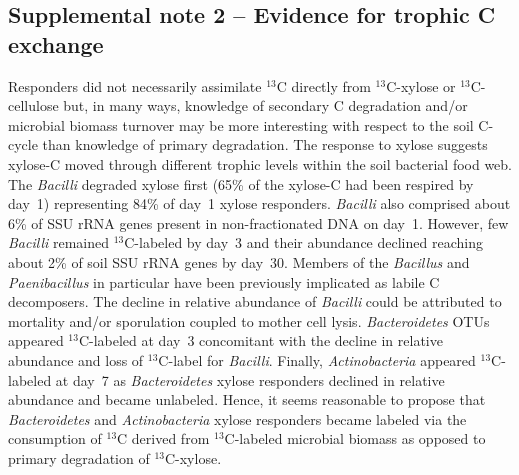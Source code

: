 \documentclass{article}
\begin{document}
\subsection{Supplemental note 2 -- Evidence for trophic C exchange}
Responders did not necessarily assimilate $^{13}$C directly
from $^{13}$C-xylose or $^{13}$C-cellulose but, in many ways, knowledge of
secondary C degradation and/or microbial biomass turnover may be more
interesting with respect to the soil C-cycle than knowledge of primary
degradation. The response to xylose suggests xylose-C moved through different
trophic levels within the soil bacterial food web. The \textit{Bacilli}
degraded xylose first (65\% of the xylose-C had been respired by day~1)
representing 84\% of day~1 xylose responders. \textit{Bacilli} also comprised
about 6\% of SSU rRNA genes present in non-fractionated DNA on day~1. However,
few \textit{Bacilli} remained $^{13}$C-labeled by day~3 and their abundance
declined reaching about 2\% of soil SSU rRNA genes by day~30. Members of the
\textit{Bacillus} \citep{Cleveland2007} and \textit{Paenibacillus} in
particular \citep{Verastegui_2014} have been previously implicated as labile
C decomposers. The decline in relative abundance of \textit{Bacilli} could be
attributed to mortality and/or sporulation coupled to mother cell lysis.
\textit{Bacteroidetes} OTUs appeared $^{13}$C-labeled at day~3 concomitant with
the decline in relative abundance and loss of $^{13}$C-label for
\textit{Bacilli}. Finally, \textit{Actinobacteria} appeared $^{13}$C-labeled at
day~7 as \textit{Bacteroidetes} xylose responders declined in relative
abundance and became unlabeled. Hence, it seems reasonable to propose that
\textit{Bacteroidetes} and \textit{Actinobacteria} xylose responders became
labeled via the consumption of $^{13}$C derived from $^{13}$C-labeled microbial
biomass as opposed to primary degradation of $^{13}$C-xylose. 
\end{document}
